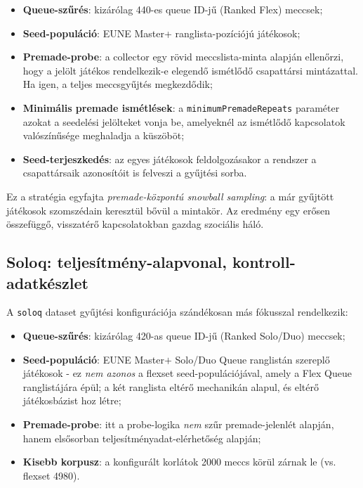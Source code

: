 ﻿\documentclass[a4paper,12pt]{report}
\begin{document}
\begin{itemize}
    \item \textbf{Queue-szűrés}: kizárólag 440-es queue ID-jű (Ranked Flex) meccsek;
    \item \textbf{Seed-populáció}: EUNE Master+ ranglista-pozíciójú játékosok;
    \item \textbf{Premade-probe}: a collector egy rövid meccslista-minta alapján ellenőrzi, hogy a jelölt játékos rendelkezik-e elegendő ismétlődő csapattársi mintázattal. Ha igen, a teljes meccsgyűjtés megkezdődik;
    \item \textbf{Minimális premade ismétlések}: a \texttt{minimumPremadeRepeats} paraméter azokat a seedelési jelölteket vonja be, amelyeknél az ismétlődő kapcsolatok valószínűsége meghaladja a küszöböt;
    \item \textbf{Seed-terjeszkedés}: az egyes játékosok feldolgozásakor a rendszer a csapattársaik azonosítóit is felveszi a gyűjtési sorba.
\end{itemize}

Ez a stratégia egyfajta \emph{premade-központú snowball sampling}: a már gyűjtött játékosok szomszédain keresztül bővül a mintakör. Az eredmény egy erősen összefüggő, visszatérő kapcsolatokban gazdag szociális háló.

\subsection{Soloq: teljesítmény-alapvonal, kontroll-adatkészlet}

A \texttt{soloq} dataset gyűjtési konfigurációja szándékosan más fókusszal rendelkezik:

\begin{itemize}
    \item \textbf{Queue-szűrés}: kizárólag 420-as queue ID-jű (Ranked Solo/Duo) meccsek;
    \item \textbf{Seed-populáció}: EUNE Master$+$ Solo/Duo Queue ranglistán szereplő játékosok - ez \emph{nem azonos} a flexset seed-populációjával, amely a Flex Queue ranglistájára épül; a két ranglista eltérő mechanikán alapul, és eltérő játékosbázist hoz létre;
    \item \textbf{Premade-probe}: itt a probe-logika \emph{nem} szűr premade-jelenlét alapján, hanem elsősorban teljesítményadat-elérhetőség alapján;
    \item \textbf{Kisebb korpusz}: a konfigurált korlátok 2000 meccs körül zárnak le (vs. flexset 4980).
\end{itemize}
\end{document}
